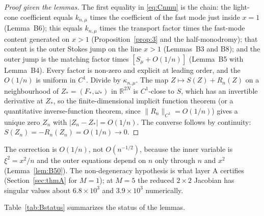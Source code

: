 \documentclass{amsart}
\numberwithin{equation}{section}
\theoremstyle{plain}
\theoremstyle{definition}
\theoremstyle{remark}
\begin{document}
\begin{proof}[Proof given the lemmas]
The first equality in \eqref{eq:Cnmu} is the chain: the light-cone coefficient equals $k_{n,\mu}$ times the coefficient of
the fast mode just inside $x = 1$ (Lemma~B6); this equals $k_{n,\mu}$ times the transport factor times the fast-mode content
generated on $x > 1$ (Proposition~\ref{prop:3} and the half-monodromy); that content is the outer Stokes jump on the line
$x > 1$ (Lemmas~B3 and B8); and the outer jump is the matching factor times $[S_\mu + O(1/n)]$ (Lemma~B5 with Lemma~B4).
Every factor is non-zero and explicit at leading order, and the $O(1/n)$ is uniform in $C^1$. Divide by
$\kappa_{n,\mu}$. The map $Z \mapsto S(Z) + R_n(Z)$ on a neighbourhood of $Z_* = (F_*, \omega_*)$ in $\mathbb R^{2N}$ is
$C^1$-close to $S$, which has an invertible derivative at $Z_*$, so the finite-dimensional implicit function theorem (or a
quantitative inverse-function theorem, since $\|R_n\|_{C^1} = O(1/n)$) gives a unique zero $Z_n$ with
$|Z_n - Z_*| = O(1/n)$. The converse follows by continuity: $S(Z_n) = -R_n(Z_n) = O(1/n) \to 0$.
\end{proof}

The correction is $O(1/n)$, not $O(n^{-1/2})$, because the inner variable is $\xi^2 = x^2/n$ and the outer equations depend
on $n$ only through $n$ and $x^2$ (Lemma~\ref{lem:B50}). The non-degeneracy hypothesis is what layer A certifies
(Section~\ref{sec:thmA} for $M = 1$); at $M = 5$ the reduced $2\times2$ Jacobian has singular values about
$6.8\times10^3$ and $3.9\times10^3$ numerically.

Table~\ref{tab:Bstatus} summarizes the status of the lemmas.
\end{document}
